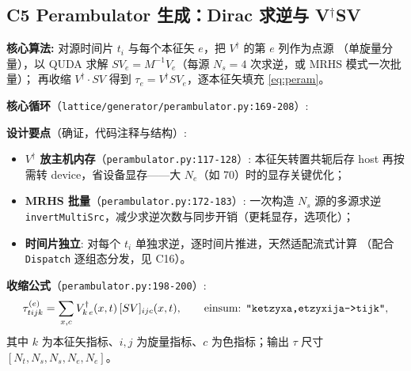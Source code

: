 \documentclass[UTF8]{ctexart}
\begin{document}
\subsection{C5 Perambulator 生成：Dirac 求逆与 V$^\dagger$SV}
\label{sec:c5}

\begin{algobox}
\textbf{核心算法:} 对源时间片 $t_i$ 与每个本征矢 $e$，把 $V^\dagger$ 的第 $e$ 列作为点源
（单旋量分量），以 QUDA 求解 $SV_e = M^{-1}V_e$（每源 $N_s=4$ 次求逆，或 MRHS 模式一次批量）；
再收缩 $V^\dagger \cdot SV$ 得到 $\tau_e = V^\dagger SV_e$，逐本征矢填充 \eqref{eq:peram}。
\end{algobox}

\textbf{核心循环}（\texttt{lattice/generator/perambulator.py:169-208}）:


\textbf{设计要点}（确证，代码注释与结构）:
\begin{itemize}
\item \textbf{$V^\dagger$ 放主机内存}（\texttt{perambulator.py:117-128}）: 本征矢转置共轭后存
  host 再按需转 device，省设备显存——大 $N_e$（如 70）时的显存关键优化；
\item \textbf{MRHS 批量}（\texttt{perambulator.py:172-183}）: 一次构造 $N_s$ 源的多源求逆
  \texttt{invertMultiSrc}，减少求逆次数与同步开销（更耗显存，选项化）；
\item \textbf{时间片独立}: 对每个 $t_i$ 单独求逆，逐时间片推进，天然适配流式计算
  （配合 \texttt{Dispatch} 逐组态分发，见 C16）。
\end{itemize}

\textbf{收缩公式}（\texttt{perambulator.py:198-200}）:
\begin{equation}\label{eq:vsb}
\tau_{tijk}^{(e)} = \sum_{x,c} V^\dagger_{k\,e}(x,t)\, [SV]_{i j c}(x,t),
\qquad \text{einsum: \texttt{"ketzyxa,etzyxija->tijk"}},
\end{equation}
其中 $k$ 为本征矢指标、$i,j$ 为旋量指标、$c$ 为色指标；输出 $\tau$ 尺寸 $[N_t, N_s, N_s, N_e, N_e]$。
\end{document}
